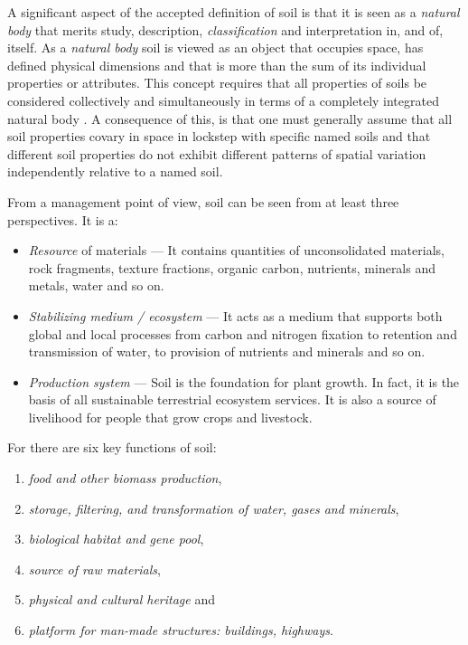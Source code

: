 \documentclass[graybox,natbib,nospthms,UStrade]{svmono}
\begin{document}
A significant aspect of the accepted definition of soil is that it is
seen as a \emph{natural body} that merits study, description,
\emph{classification} and interpretation in, and of, itself. As a \emph{natural
body} soil is viewed as an object that occupies space, has defined
physical dimensions and that is more than the sum of its individual
properties or attributes. This concept requires that all properties of
soils be considered collectively and simultaneously in terms of a completely integrated
natural body \citep{SSDS1993}. A consequence of this, is that one must
generally assume that all soil properties covary in space in lockstep
with specific named soils and that different soil properties do not
exhibit different patterns of spatial variation independently relative
to a named soil.

From a management point of view, soil can be seen from at least three
perspectives. It is a:

\begin{itemize}
\item
  \emph{Resource} of materials --- It contains quantities of unconsolidated
  materials, rock fragments, texture fractions, organic carbon,
  nutrients, minerals and metals, water and so on.
\item
  \emph{Stabilizing medium / ecosystem} --- It acts as a medium that supports
  both global and local processes from carbon and nitrogen fixation to
  retention and transmission of water, to provision of nutrients and
  minerals and so on.
\item
  \emph{Production system} --- Soil is the foundation for plant growth. In
  fact, it is the basis of all sustainable terrestrial
  ecosystem services. It is also a source of livelihood for people
  that grow crops and livestock.
\end{itemize}

For \citet{frossard2006function} there are six key functions of soil:

\begin{enumerate}
\def\labelenumi{\arabic{enumi}.}
\item
  \emph{food and other biomass production},
\item
  \emph{storage, filtering, and transformation of water, gases and
  minerals},
\item
  \emph{biological habitat and gene pool},
\item
  \emph{source of raw materials},
\item
  \emph{physical and cultural heritage} and
\item
  \emph{platform for man-made structures: buildings, highways}.
\end{enumerate}
\end{document}
